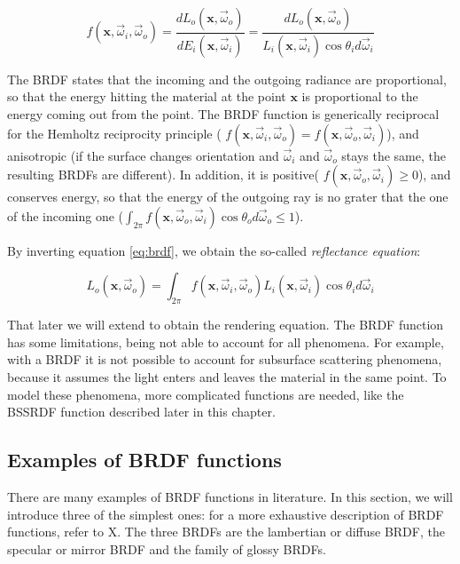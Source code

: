 \begin{equation}
f(\mathbf{x}, \vec{\omega}_i, \vec{\omega}_o) = \frac{d L_o(\mathbf{x}, \vec{\omega}_o)}{d E_i(\mathbf{x}, \vec{\omega}_i)} = \frac{d L_o(\mathbf{x}, \vec{\omega}_o)}{L_i(\mathbf{x}, \vec{\omega}_i) \cos\theta_i d \vec{\omega}_i}
\label{eq:brdf}
\end{equation}

The BRDF states that the incoming and the outgoing radiance are proportional, so that the energy hitting the material at the point $\mathbf{x}$ is proportional to the energy coming out from the point. The BRDF function is generically reciprocal for the Hemholtz reciprocity principle ( $f(\mathbf{x}, \vec{\omega}_i, \vec{\omega}_o) = f(\mathbf{x}, \vec{\omega}_o, \vec{\omega}_i)$), and anisotropic (if the surface changes orientation and $\vec{\omega}_i$ and $\vec{\omega}_o$ stays the same, the resulting BRDFs are different). In addition, it is positive( $f(\mathbf{x}, \vec{\omega}_o, \vec{\omega}_i) \ge 0$), and conserves energy, so that the energy of the outgoing ray is no grater that the one of the incoming one ($\int_{2\pi}  f(\mathbf{x}, \vec{\omega}_o, \vec{\omega}_i) \cos\theta_o d\vec{\omega}_o \le 1$).

By inverting equation \ref{eq:brdf}, we obtain the so-called \emph{reflectance equation}:

$$
L_o(\mathbf{x}, \vec{\omega}_o) = \int_{2\pi} f(\mathbf{x}, \vec{\omega}_i, \vec{\omega}_o) L_i(\mathbf{x}, \vec{\omega}_i) \cos\theta_i d\vec{\omega}_i
$$

That later we will extend to obtain the rendering equation. The BRDF function has some limitations, being not able to account for all phenomena. For example, with a BRDF it is not possible to account for subsurface scattering phenomena, because it assumes the light enters and leaves the material in the same point. To model these phenomena, more complicated functions are needed, like the BSSRDF function described later in this chapter. 

\subsection{Examples of BRDF functions}

There are many examples of BRDF functions in literature. In this section, we will introduce three of the simplest ones: for a more exhaustive description of BRDF functions, refer to X. The three BRDFs are the lambertian or diffuse BRDF, the specular or mirror BRDF and the family of glossy BRDFs.

